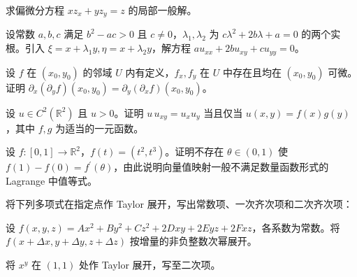 \noindent\begin{minipage}{\textwidth}
求偏微分方程 $xz_x+yz_y=z$ 的局部一般解。
\end{minipage}\par\vfill
\newpage
\noindent\begin{minipage}{\textwidth}
设常数 $a,b,c$ 满足 $b^2-ac>0$ 且 $c\ne0$，$\lambda_1,\lambda_2$ 为 $c\lambda^2+2b\lambda+a=0$ 的两个实根。引入 $\xi=x+\lambda_1y,\eta=x+\lambda_2y$，解方程 $au_{xx}+2bu_{xy}+cu_{yy}=0$。
\end{minipage}\par\vfill
\noindent\begin{minipage}{\textwidth}
设 $f$ 在 $(x_0,y_0)$ 的邻域 $U$ 内有定义，$f_x,f_y$ 在 $U$ 中存在且均在 $(x_0,y_0)$ 可微。证明 $\partial_x(\partial_y f)(x_0,y_0)=\partial_y(\partial_x f)(x_0,y_0)$。
\end{minipage}\par\vfill
\noindent\begin{minipage}{\textwidth}
设 $u\in C^2(\mathbb R^2)$ 且 $u>0$。证明 $u\,u_{xy}=u_xu_y$ 当且仅当 $u(x,y)=f(x)g(y)$，其中 $f,g$ 为适当的一元函数。
\end{minipage}\par\vfill
\newpage
\noindent\begin{minipage}{\textwidth}
设 $f:[0,1]\to\mathbb R^2$，$f(t)=(t^2,t^3)$。证明不存在 $\theta\in(0,1)$ 使 $f(1)-f(0)=f^{\prime}(\theta)$，由此说明向量值映射一般不满足数量函数形式的 Lagrange 中值等式。
\end{minipage}\par\vfill
\noindent\begin{minipage}{\textwidth}
将下列多项式在指定点作 Taylor 展开，写出常数项、一次齐次项和二次齐次项：
\end{minipage}\par\vfill
\noindent\begin{minipage}{\textwidth}
设 $f(x,y,z)=Ax^2+By^2+Cz^2+2Dxy+2Eyz+2Fxz$，各系数为常数。将 $f(x+\Delta x,y+\Delta y,z+\Delta z)$ 按增量的非负整数次幂展开。
\end{minipage}\par\vfill
\newpage
\noindent\begin{minipage}{\textwidth}
将 $x^y$ 在 $(1,1)$ 处作 Taylor 展开，写至二次项。
\end{minipage}\par\vfill
